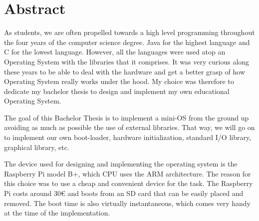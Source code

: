 \chapter{Abstract}
As students, we are often propelled towards a high level programming throughout the four years of the computer science degree. Java for the highest language and C for the lowest language. However, all the languages were used atop an Operating System with the libraries that it comprises.
It was very curious along these years to be able to deal with the hardware and get a better grasp of how Operating System really works under the hood. My choice was therefore to dedicate my bachelor thesis to design and implement my own educational Operating System.

The goal of this Bachelor Thesis is to implement a mini-OS from the ground up avoiding as much as possible the use of external libraries. That way, we will go on to implement our own boot-loader, hardware initialization, standard I/O library, graphical library, etc.

The device used for designing and implementing the operating system is the Raspberry Pi model B+, which CPU uses the ARM architecture. The reason for this choice was to use a cheap and convenient device for the task. The Raspberry Pi costs around 30\euro{} and boots from an SD card that can be easily placed and removed. The boot time is also virtually instantaneous, which comes very handy at the time of the implementation.
